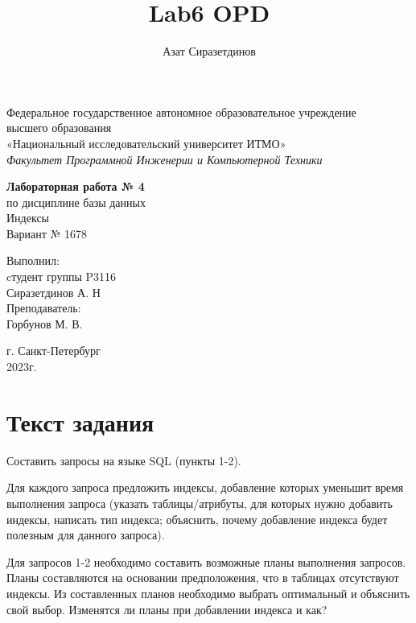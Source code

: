 \documentclass[12pt]{article}
\title{Lab6 OPD}
\author{Азат Сиразетдинов}
\begin{document}
	\thispagestyle{empty}
	\begin{center}
		Федеральное государственное автономное образовательное учреждение\\ 
		высшего образования\\
		«Национальный исследовательский университет ИТМО»\\
		\textit{Факультет Программной Инженерии и Компьютерной Техники}\\
	\end{center}
	\vspace{2cm}
	\begin{center}
		\large
		\textbf{Лабораторная работа № 4}\\
		по дисциплине базы данных\\
		Индексы\\
		Вариант № 1678
	\end{center}
	\vspace{7cm}
	\begin{flushright}
		Выполнил:\\
		cтудент  группы P3116\\
		Сиразетдинов А. Н\\
		Преподаватель: \\
		Горбунов М. В.\\
	\end{flushright}
	\vspace{6cm}
	\begin{center}
		г. Санкт-Петербург\\
		2023г.
	\end{center}
	\newpage
	
	\tableofcontents
	\newpage
	
	\section{Текст задания}
	Составить запросы на языке SQL (пункты 1-2).
	
	Для каждого запроса предложить индексы, добавление которых уменьшит время выполнения запроса (указать таблицы/атрибуты, для которых нужно добавить индексы, написать тип индекса; объяснить, почему добавление индекса будет полезным для данного запроса).
	
	Для запросов 1-2 необходимо составить возможные планы выполнения запросов. Планы составляются на основании предположения, что в таблицах отсутствуют индексы. Из составленных планов необходимо выбрать оптимальный и объяснить свой выбор.
	Изменятся ли планы при добавлении индекса и как?
	
\end{document}
